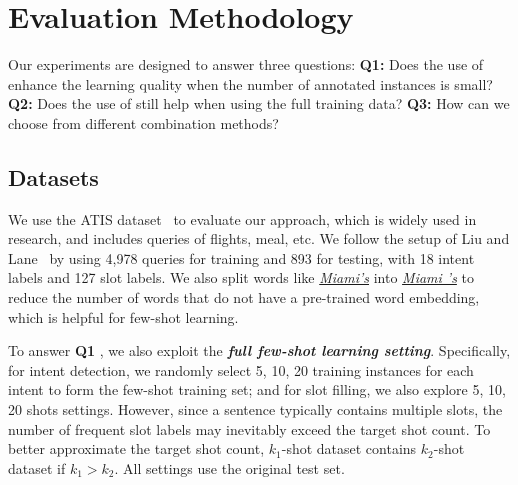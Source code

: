 \section{Evaluation Methodology}
Our experiments are designed to answer three questions: \textbf{Q1:} Does the use of \REs enhance the learning quality when the number of annotated
instances is small?  \textbf{Q2:}  Does the use of \REs still help when using the full training data?
 \textbf{Q3:}  How can we choose from different combination methods?

\subsection{Datasets}
\label{sec_datasest}

We use the ATIS dataset~\cite{hemphill1990atis} to evaluate our approach, which is widely used in \SLU research, and
includes queries of flights, meal, etc. We follow the setup of Liu and Lane~ by using 4,978 queries for training and 893 for
testing, with 18 intent labels and 127 slot labels.
We also split words like
\textsl{\underline{Miami's}} into \textsl{\underline{Miami 's}} to reduce the number of words that do not have a pre-trained word
embedding, which is helpful for few-shot learning.

To answer  \textbf{Q1} , we also exploit the \textbf{\emph{full few-shot learning setting}}. Specifically, for intent detection, we randomly
select 5, 10, 20 training instances for each intent to form the few-shot training set; and for slot filling, we also explore 5, 10, 20
shots settings. However, since a sentence typically contains multiple slots, the number of frequent slot labels may inevitably exceed
the target shot count. To better approximate the target shot count, 
$k_1$-shot dataset contains $k_2$-shot dataset if $k_1>k_2$.
All settings use the original test set.

